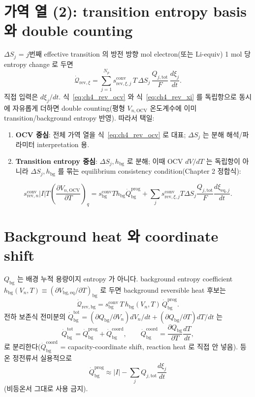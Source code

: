 \documentclass[11pt,a4paper]{article}
\newcommand{\eq}{\mathrm{eq}}
\newcommand{\tot}{\mathrm{tot}}
\newcommand{\bg}{\mathrm{bg}}
\newcommand{\OCV}{\mathrm{OCV}}
\newcommand{\rev}{\mathrm{rev}}
\newcommand{\prog}{\mathrm{prog}}
\newcommand{\coord}{\mathrm{coord}}
\newcommand{\conv}{\mathrm{conv}}
\begin{document}
\section{가역 열 (2): transition entropy basis 와 double counting}\label{sec:ch4_revxi}
$\Delta S_j$ = $j$번째 effective transition 의 방전 방향 mol electron(또는 Li-equiv) 1 mol 당 entropy
change 로 두면
\begin{equation}
\dot{\mathcal Q}_{\rev,\xi}=\sum_{j=1}^{N_p}s_{\rev,\xi,j}^{\conv}\,T\,\Delta S_j\,\frac{Q_{j,\tot}}{F}\,\frac{d\xi_j}{dt}.
\label{eq:ch4_rev_xi}
\end{equation}
직접 입력은 $d\xi_j/dt$. 식~\eqref{eq:ch4_rev_ocv} 와 식~\eqref{eq:ch4_rev_xi} 를 독립항으로 동시에 자유롭게
더하면 double counting(평형 $V_{n,\OCV}$ 온도계수에 이미 transition/background entropy 반영). 따라서 택일:
\begin{enumerate}[label=\Alph*),leftmargin=2.0em]
\item \textbf{OCV 중심}: 전체 가역 열을 식~\eqref{eq:ch4_rev_ocv} 로 대표; $\Delta S_j$ 는 분해 해석/파라미터
  interpretation 용.
\item \textbf{Transition entropy 중심}: $\Delta S_j, h_\bg$ 로 분해; 이때 OCV $dV/dT$ 는 독립항이 아니라
  $\Delta S_j,h_\bg$ 를 묶는 equilibrium consistency condition(Chapter 2 정합식):
\end{enumerate}
\begin{equation}
s_{\rev,n}^{\conv}|I|T\left(\frac{\partial V_{n,\OCV}}{\partial T}\right)_q
=s_\bg^{\conv}Th_\bg\dot Q_\bg^{\prog}+\sum_j s_{\rev,\xi,j}^{\conv}T\Delta S_j\frac{Q_{j,\tot}}{F}\frac{d\xi_{\eq,j}}{dt}.
\label{eq:ch4_consistency}
\end{equation}

\section{Background heat 와 coordinate shift}\label{sec:ch4_bg}
$Q_\bg$ 는 배경 누적 용량이지 entropy 가 아니다. background entropy coefficient
$h_\bg(V_n,T)\equiv(\partial V_{\bg,\eq}/\partial T)_{\mathrm{bg}}$ 로 두면 background reversible heat 후보는
\begin{equation}
\dot{\mathcal Q}_{\rev,\bg}=s_\bg^{\conv}\,T\,h_\bg(V_n,T)\,\dot Q_\bg^{\prog}.
\label{eq:ch4_qrev_bg}
\end{equation}
전하 보존식 전미분의 $\dot Q_\bg^{\mathrm{tot}}=(\partial Q_\bg/\partial V_n)dV_n/dt+(\partial Q_\bg/\partial T)dT/dt$ 는
\begin{equation}
\dot Q_\bg^{\mathrm{tot}}=\dot Q_\bg^{\prog}+\dot Q_\bg^{\coord},\qquad
\dot Q_\bg^{\coord}=\frac{\partial Q_\bg}{\partial T}\frac{dT}{dt},
\label{eq:ch4_qbg_split}
\end{equation}
로 분리한다($\dot Q_\bg^{\coord}$ = capacity-coordinate shift, reaction heat 로 직접 안 넣음). 등온 정전류서
실용적으로
\begin{equation}
\dot Q_\bg^{\prog}\approx|I|-\sum_jQ_{j,\tot}\frac{d\xi_j}{dt}
\label{eq:ch4_qbg_iso}
\end{equation}
(비등온서 그대로 사용 금지).
\end{document}
